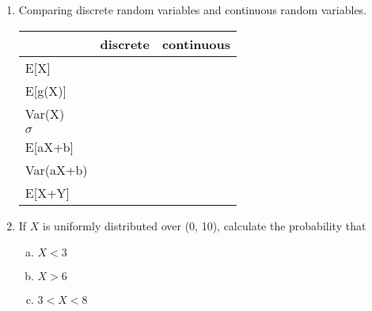 \documentclass[11pt]{article}
\begin{document}
\begin{enumerate}
\item Comparing discrete random variables and continuous random variables.

\begin{center}
\begin{tabular}{ |p{1.5in}| p{1.25in}| p{1.25in}|}%
\hline
\vspace{1mm}
&discrete & continuous  \\ \hline
\vspace{1mm}
E[X] & &\\ \hline
\vspace{1mm}
E[g(X)] & &\\ \hline
\vspace{1mm}
Var(X) & &\\ \hline
\vspace{1mm}
$\sigma$ & &\\ \hline
\vspace{1mm}
E[aX+b] & &\\ \hline
\vspace{1mm}
Var(aX+b) & &\\ \hline
\vspace{1mm}
E[X+Y] & &\\ \hline
\end{tabular}
\end{center}

\item If $X$ is uniformly distributed over (0, 10), calculate the probability that 
\begin{enumerate}[(a)]
\item $X < 3$
\item $X > 6$
\item $3 < X < 8$
\end{enumerate}

\end{enumerate}
\end{document}
